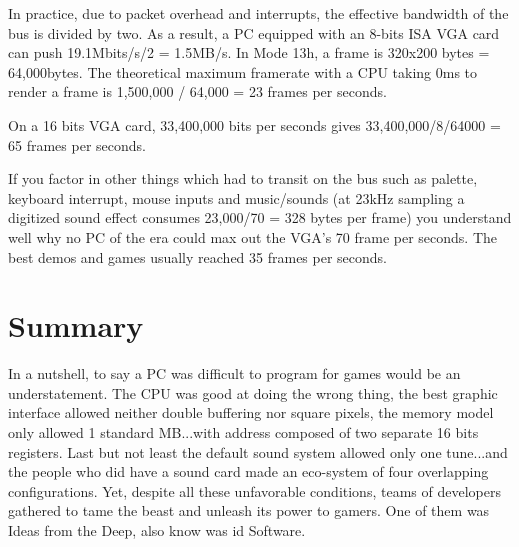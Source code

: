 \documentclass[book.tex]{subfiles}
\begin{document}
 In practice, due to packet overhead and interrupts, the effective bandwidth of the bus is divided by two. As a result, a PC equipped with an 8-bits ISA VGA card can push 19.1Mbits/s/2 = 1.5MB/s. In Mode 13h, a frame is 320x200 bytes = 64,000bytes. The theoretical maximum framerate with a CPU taking 0ms to render a frame is 1,500,000 / 64,000 = 23 frames per seconds.\\
 \par
 On a 16 bits VGA card, 33,400,000 bits per seconds gives 33,400,000/8/64000 = 65 frames per seconds.\\
 \par
 If you factor in other things which had to transit on the bus such as palette, keyboard interrupt, mouse inputs and music/sounds (at 23kHz sampling a digitized sound effect consumes 23,000/70 = 328 bytes per frame) you understand well why no PC of the era could max out the VGA's 70 frame per seconds. The best demos and games usually reached 35 frames per seconds.


\section{Summary}
In a nutshell, to say a PC was difficult to program for games would be an understatement. The CPU was good at doing the wrong thing, the best graphic interface allowed neither double buffering nor square pixels, the memory model only allowed 1 standard MB...with address composed of two separate 16 bits registers. Last but not least the default sound system allowed only one tune...and the people who did have a sound card made an eco-system of four overlapping configurations. Yet, despite all these unfavorable conditions, teams of developers gathered to tame the beast and unleash its power to gamers. One of them was Ideas from the Deep, also know was id Software.
\end{document}
